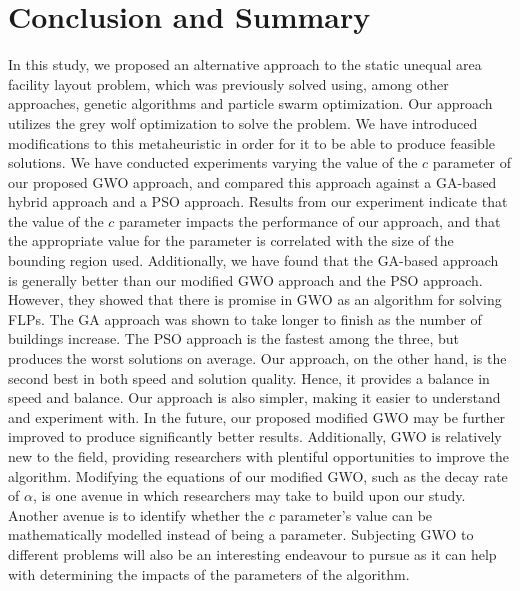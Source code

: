 \chapter{Conclusion and Summary}

In this study, we proposed an alternative approach to the static unequal area facility layout problem, which was previously solved using, among other approaches, genetic algorithms and particle swarm optimization. Our approach utilizes the grey wolf optimization to solve the problem. We have introduced modifications to this metaheuristic in order for it to be able to produce feasible solutions. We have conducted experiments varying the value of the $c$ parameter of our proposed GWO approach, and compared this approach against a GA-based hybrid approach and a PSO approach. Results from our experiment indicate that the value of the $c$ parameter impacts the performance of our approach, and that the appropriate value for the parameter is correlated with the size of the bounding region used. Additionally, we have found that the GA-based approach is generally better than our modified GWO approach and the PSO approach. However, they showed that there is promise in GWO as an algorithm for solving FLPs. The GA approach was shown to take longer to finish as the number of buildings increase. The PSO approach is the fastest among the three, but produces the worst solutions on average. Our approach, on the other hand, is the second best in both speed and solution quality. Hence, it provides a balance in speed and balance. Our approach is also simpler, making it easier to understand and experiment with. In the future, our proposed modified GWO may be further improved to produce significantly better results. Additionally, GWO is relatively new to the field, providing researchers with plentiful opportunities to improve the algorithm. Modifying the equations of our modified GWO, such as the decay rate of $\alpha$, is one avenue in which researchers may take to build upon our study. Another avenue is to identify whether the $c$ parameter's value can be mathematically modelled instead of being a parameter. Subjecting GWO to different problems will also be an interesting endeavour to pursue as it can help with determining the impacts of the parameters of the algorithm.

